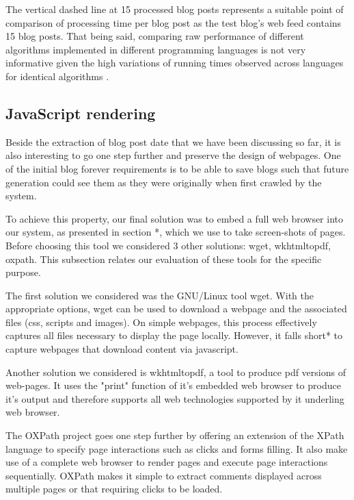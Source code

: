 The vertical dashed line at 15 processed blog posts represents a suitable point of comparison of processing time per blog post as the test blog's web feed contains 15 blog posts. That being said, comparing raw performance of different algorithms implemented in different programming languages is not very informative given the high variations of running times observed across languages for identical algorithms \cite{hundt2011}.



\subsection{JavaScript rendering}

Beside the extraction of blog post date that we have been discussing so far, it is also interesting to go one step further and preserve the design of webpages. One of the initial blog forever requirements is to be able to save blogs such that future generation could see them as they were originally when first crawled by the system.

To achieve this property, our final solution was to embed a full web browser into our system, as presented in section *, which we use to take screen-shots of pages. Before choosing this tool we considered 3 other solutions: wget, wkhtmltopdf, oxpath. This subsection relates our evaluation of these tools for the specific purpose.

The first solution we considered was the GNU/Linux tool wget. With the appropriate options, wget can be used to download a webpage and the associated files (css, scripts and images). On simple webpages, this process effectively captures all files necessary to display the page locally. However, it falls short* to capture webpages that download content via javascript.

Another solution we considered is wkhtmltopdf, a tool to produce pdf versions of web-pages. It uses the "print" function of it's embedded web browser to produce it's output and therefore supports all web technologies supported by it underling web browser.

The OXPath project goes one step further by offering an extension of the XPath language to specify page interactions such as clicks and forms filling. It also make use of a complete web browser to render pages and execute page interactions sequentially. OXPath makes it simple to extract comments displayed across multiple pages or that requiring clicks to be loaded.


